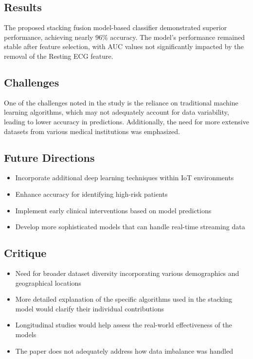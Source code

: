 \subsection*{Results}
The proposed stacking fusion model-based classifier demonstrated superior performance, achieving nearly 96\% accuracy. The model's performance remained stable after feature selection, with AUC values not significantly impacted by the removal of the Resting ECG feature.

\subsection*{Challenges}
One of the challenges noted in the study is the reliance on traditional machine learning algorithms, which may not adequately account for data variability, leading to lower accuracy in predictions. Additionally, the need for more extensive datasets from various medical institutions was emphasized.

\subsection*{Future Directions}
\begin{itemize}
    \item Incorporate additional deep learning techniques within IoT environments
    \item Enhance accuracy for identifying high-risk patients
    \item Implement early clinical interventions based on model predictions
    \item Develop more sophisticated models that can handle real-time streaming data
\end{itemize}

\subsection*{Critique}
\begin{itemize}
    \item Need for broader dataset diversity incorporating various demographics and geographical locations
    \item More detailed explanation of the specific algorithms used in the stacking model would clarify their individual contributions
    \item Longitudinal studies would help assess the real-world effectiveness of the models
    \item The paper does not adequately address how data imbalance was handled
\end{itemize}

